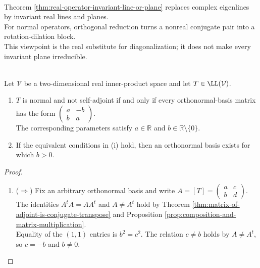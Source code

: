 \begin{perspective} \label{per:real-normal-operators-planes} \\
Theorem \ref{thm:real-operator-invariant-line-or-plane} replaces complex eigenlines by invariant real lines and planes.\\
For normal operators, orthogonal reduction turns a nonreal conjugate pair into a rotation-dilation block.\\
This viewpoint is the real substitute for diagonalization; it does not make every invariant plane irreducible.
\end{perspective}

\begin{proposition} \label{prop:two-dimensional-real-normal-block} \\
Let $\mathcal{V}$ be a two-dimensional real inner-product space and let $T\in\LL(\mathcal{V})$.
\begin{enumerate}[label=(\roman*)]
\setlength{\itemsep}{0pt}
\item $T$ is normal and not self-adjoint if and only if every orthonormal-basis matrix has the form $\left(\begin{smallmatrix}a&-b\\b&a\end{smallmatrix}\right)$.\\
The corresponding parameters satisfy $a\in\mathbb{R}$ and $b\in\mathbb{R}\setminus\{0\}$.
\item If the equivalent conditions in (i) hold, then an orthonormal basis exists for which $b>0$.
\end{enumerate}
\begin{proof}
\begin{enumerate}[label=(\roman*)]
\setlength{\itemsep}{0pt}
\item[$(i)$] ($\Rightarrow$) Fix an arbitrary orthonormal basis and write $A=[T]=\left(\begin{smallmatrix}a&c\\b&d\end{smallmatrix}\right)$.\\
The identities $A^tA=AA^t$ and $A\neq A^t$ hold by Theorem \ref{thm:matrix-of-adjoint-is-conjugate-transpose} and Proposition \ref{prop:composition-and-matrix-multiplication}.\\
Equality of the $(1,1)$ entries is $b^2=c^2$. The relation $c\neq b$ holds by $A\neq A^t$, so $c=-b$ and $b\neq0$.\\

\end{enumerate}
\end{proof}
\end{proposition}
